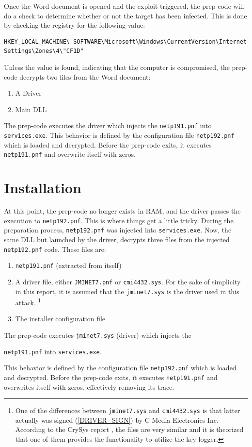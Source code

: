 \documentclass[11pt,english,a4paper]{report}
\begin{document}
Once the Word document is opened and the exploit triggered, the prep-code will do a check to determine whether or not the target has been infected. This is done by checking the registry for the following value:
\begin{lstlisting}
HKEY_LOCAL_MACHINE\ SOFTWARE\Microsoft\Windows\CurrentVersion\Internet Settings\Zones\4\"CF1D" 
\end{lstlisting}
Unless the value is found, indicating that the computer is compromised, the prep-code decrypts two files from the Word document:
 \begin{enumerate}
   \item  A Driver
   \item  Main DLL
  \end{enumerate}
{\raggedright
The prep-code executes the driver which injects the \texttt{netp191.pnf} into \texttt{services.exe}. This behavior is defined by the configuration file \texttt{netp192.pnf} which is loaded and decrypted. Before the prep-code exits, it executes \texttt{netp191.pnf} and overwrite itself with zeros. 
\par}

\section{Installation}
At this point, the prep-code no longer exists in RAM, and the driver passes the execution to \texttt{netp192.pnf}. This is where things get a little tricky. During the preparation process, \texttt{netp192.pnf} was injected into \texttt{services.exe}. Now, the same DLL but launched by the driver, decrypts three files from the injected \texttt{netp192.pnf} code. These files are:
 \begin{enumerate}
   \item \texttt{netp191.pnf} (extracted from itself)
   \item A driver file, either \texttt{JMINET7.pnf} or \texttt{cmi4432.sys}. For the sake of simplicity in this report, it is assumed that the \texttt{jminet7.sys} is the driver used in this attack. \footnote{One of the differences between \texttt{jminet7.sys} and \texttt{cmi4432.sys} is that latter actually was signed (\ref{DRIVER_SIGN}) by C-Media Electronics Inc. According to the CrySys report \cite{DUQU_BUD}, the files are very similar and it is theorized that one of them provides the functionality to utilize the key logger.}
   \item The installer configuration file
  \end{enumerate}
The prep-code executes \texttt{jminet7.sys} (driver) which injects the {\raggedright \texttt{netp191.pnf} into \texttt{services.exe}. \par} This behavior is defined by the configuration file \texttt{netp192.pnf} which is loaded and decrypted. Before the prep-code exits, it executes \texttt{netp191.pnf} and overwrites itself with zeros, effectively removing its trace. 
\end{document}

